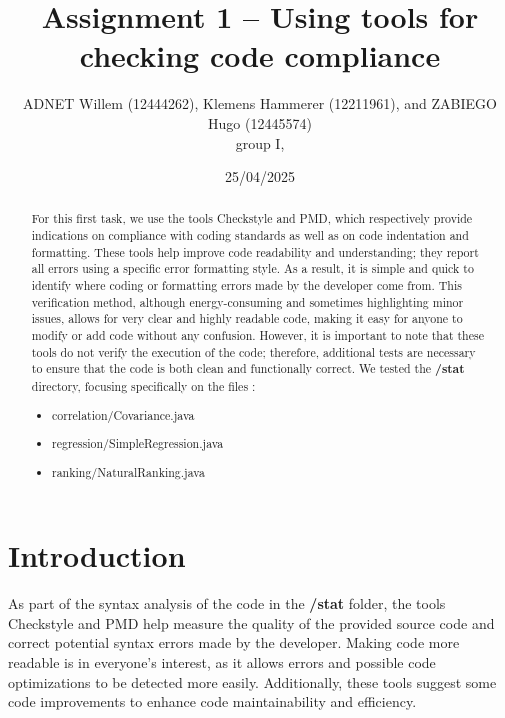\documentclass[twocolumn,10pt]{article}
\begin{document}
\title{Assignment 1 -- Using tools for checking code compliance}
\author{ADNET Willem (12444262), Klemens Hammerer (12211961), and ZABIEGO Hugo (12445574) \\
group I, 
}

\date{25/04/2025}

\maketitle

\begin{abstract}
For this first task, we use the tools Checkstyle and PMD, which respectively provide indications on compliance with coding standards as well as on code indentation and formatting. These tools help improve code readability and understanding; they report all errors using a specific error formatting style. As a result, it is simple and quick to identify where coding or formatting errors made by the developer come from.
This verification method, although energy-consuming and sometimes highlighting minor issues, allows for very clear and highly readable code, making it easy for anyone to modify or add code without any confusion.
However, it is important to note that these tools do not verify the execution of the code; therefore, additional tests are necessary to ensure that the code is both clean and functionally correct.
We tested the \textbf{/stat} directory, focusing specifically on the files : 
\begin{itemize}[itemsep=0pt, topsep=0pt, parsep=0pt, partopsep=0pt]
    \item correlation/Covariance.java
    \item regression/SimpleRegression.java
    \item ranking/NaturalRanking.java
\end{itemize}

\end{abstract}

\section{Introduction}

As part of the syntax analysis of the code in the \textbf{/stat} folder, the tools Checkstyle and PMD help measure the quality of the provided source code and correct potential syntax errors made by the developer. Making code more readable is in everyone's interest, as it allows errors and possible code optimizations to be detected more easily. Additionally, these tools suggest some code improvements to enhance code maintainability and efficiency. 
\end{document}
